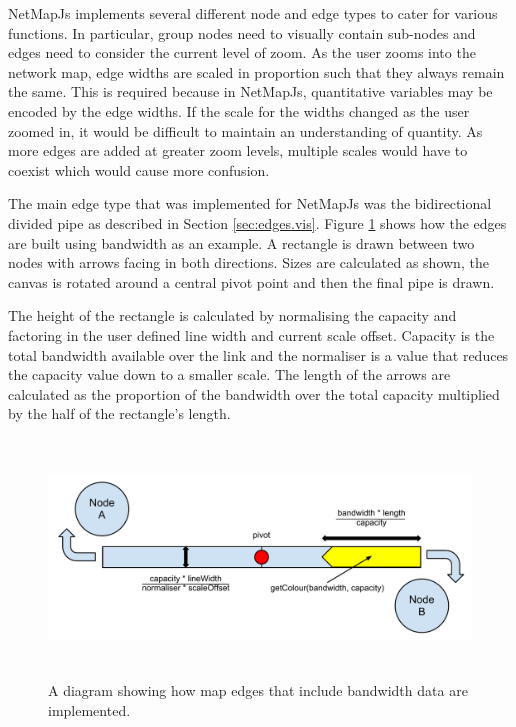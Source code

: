 \documentclass[11pt, a4paper]{report}
\begin{document}
NetMapJs implements several different node and edge types to cater for various
functions. In particular, group nodes need to visually contain sub-nodes and
edges need to consider the current level of zoom. As the user zooms into the
network map, edge widths are scaled in proportion such that they always remain
the same. This is required because in NetMapJs, quantitative variables may be
encoded by the edge widths. If the scale for the widths changed as the user
zoomed in, it would be difficult to maintain an understanding of quantity. As
more edges are added at greater zoom levels, multiple scales would have to
coexist which would cause more confusion.

The main edge type that was implemented for NetMapJs was the bidirectional
divided pipe as described in Section \ref{sec:edges.vis}. Figure
\ref{fig:nodesedges1.0} shows how the edges are built using bandwidth as an
example. A rectangle is drawn between two nodes with arrows facing in both
directions. Sizes are calculated as shown, the canvas is rotated around a
central pivot point and then the final pipe is drawn.

The height of the rectangle is calculated by normalising the capacity and
factoring in the user defined line width and current scale offset.
Capacity is the total bandwidth available over the link and the normaliser is a
value that reduces the capacity value down to a smaller scale. The length of the
arrows are calculated as the proportion of the bandwidth over the total capacity
multiplied by the half of the rectangle's length.



\begin{figure}
\centering
\includegraphics[width=170mm,height=63.24mm]{assets/nodesedges1-0.pdf}
\caption{A diagram showing how map edges that include bandwidth data are implemented.}
\label{fig:nodesedges1.0}
\end{figure}
\end{document}
